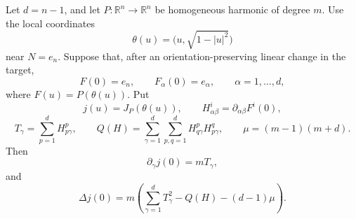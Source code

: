 \documentclass[10pt,a4paper]{amsart}
\newcommand{\R}{\mathbb R}
\begin{document}
\begin{proposition}
\label{prop-trace-formula}
Let \(d=n-1\), and let \(P:\R^n\to\R^n\) be homogeneous harmonic of degree
\(m\). Use the local coordinates
\[
        \theta(u)=\bigl(u,\sqrt{1-|u|^2}\bigr)
\]
near \(N=e_n\). Suppose that, after an orientation-preserving linear change
in the target,
\begin{equation}\label{normalization}
        F(0)=e_n,
        \qquad
        F_\alpha(0)=e_\alpha,\qquad \alpha=1,\ldots,d,
\end{equation}
where \(F(u)=P(\theta(u))\). Put
\[
        j(u)=J_P(\theta(u)),
        \qquad
        H^i_{\alpha\beta}=\partial_{\alpha\beta}F^i(0),
\]
\[
        T_\gamma=\sum_{p=1}^{d}H^p_{p\gamma},
        \qquad
        Q(H)=\sum_{\gamma=1}^{d}\sum_{p,q=1}^{d}
              H^p_{q\gamma}H^q_{p\gamma},
        \qquad
        \mu=(m-1)(m+d).
\]
Then
\begin{equation}\label{first-derivative-j}
        \partial_\gamma j(0)=mT_\gamma,
\end{equation}
and
\begin{equation}\label{trace-formula}
        \Delta j(0)
        =
        m\left(
          \sum_{\gamma=1}^{d}T_\gamma^2
          -
          Q(H)
          -
          (d-1)\mu
        \right).
\end{equation}
\end{proposition}
\end{document}
